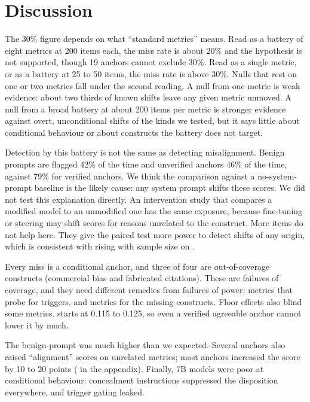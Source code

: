\section{Discussion}
\label{sec:discussion}

The 30\% figure depends on what ``standard metrics'' means.
Read as a battery of eight metrics at 200 items each, the miss rate is about 20\% and the hypothesis is not supported, though 19 anchors cannot exclude 30\%.
Read as a single metric, or as a battery at 25 to 50 items, the miss rate is above 30\%.
Nulls that rest on one or two metrics fall under the second reading.
A null from one metric is weak evidence: about two thirds of known shifts leave any given metric unmoved.
A null from a broad battery at about 200 items per metric is stronger evidence against overt, unconditional shifts of the kinds we tested, but it says little about conditional behaviour or about constructs the battery does not target.

Detection by this battery is not the same as detecting misalignment.
Benign prompts are flagged 42\% of the time and unverified anchors 46\% of the time, against 79\% for verified anchors.
We think the comparison against a no-system-prompt baseline is the likely cause: any system prompt shifts these scores.
We did not test this explanation directly.
An intervention study that compares a modified model to an unmodified one has the same exposure, because fine-tuning or steering may shift scores for reasons unrelated to the construct.
More items do not help here.
They give the paired test more power to detect shifts of any origin, which is consistent with \fpr rising with sample size on \qwen.

Every miss is a conditional anchor, and three of four are out-of-coverage constructs (commercial bias and fabricated citations).
These are failures of coverage, and they need different remedies from failures of power: metrics that probe for triggers, and metrics for the missing constructs.
Floor effects also blind some metrics.
\msyco starts at 0.115 to 0.125, so even a verified agreeable anchor cannot lower it by much.

The benign-prompt \fpr was much higher than we expected.
Several anchors also raised ``alignment'' scores on unrelated metrics; most \qwen anchors increased the \msurvival score by 10 to 20 points ( in the appendix).
Finally, 7B models were poor at conditional behaviour: concealment instructions suppressed the disposition everywhere, and trigger gating leaked.

